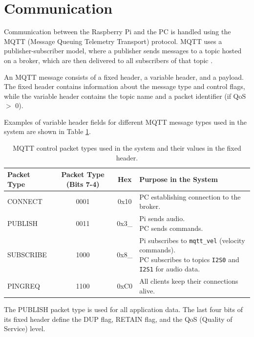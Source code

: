 \section{Communication}


Communication between the Raspberry Pi and the PC is handled using the MQTT (Message Queuing Telemetry Transport) protocol. MQTT uses a publisher-subscriber model, where a publisher sends messages to a topic hosted on a broker, which are then delivered to all subscribers of that topic \cite{OASIS_MQTT5}.

An MQTT message consists of a fixed header, a variable header, and a payload. The fixed header contains information about the message type and control flags, while the variable header contains the topic name and a packet identifier (if QoS $>$ 0).

Examples of variable header fields for different MQTT message types used in the system are shown in Table \ref{tab:mqtt_packet_types}.

\begin{table}[htbp]
    \centering
    \begin{tabular}{l c c l}
        \toprule
        \textbf{Packet Type} & \textbf{Packet Type (Bits 7-4)} & \textbf{Hex} & \textbf{Purpose in the System} \\
        \midrule
        CONNECT  & 0001 & 0x10 & PC establishing connection to the broker. \\
        PUBLISH  & 0011 & 0x3\_ & \makecell[l]{Pi sends audio.\\PC sends commands.} \\
        SUBSCRIBE & 1000 & 0x8\_ & \makecell[l]{Pi subscribes to \texttt{mqtt\_vel} (velocity commands).\\PC subscribes to topics \texttt{I2S0} and \texttt{I2S1} for audio data.} \\
        PINGREQ  & 1100 & 0xC0 & All clients keep their connections alive. \\
        \bottomrule
    \end{tabular}
    \caption{MQTT control packet types used in the system and their values in the fixed header.}
    \label{tab:mqtt_packet_types}
\end{table}

The PUBLISH packet type is used for all application data. The last four bits of its fixed header define the DUP flag, RETAIN flag, and the QoS (Quality of Service) level.

